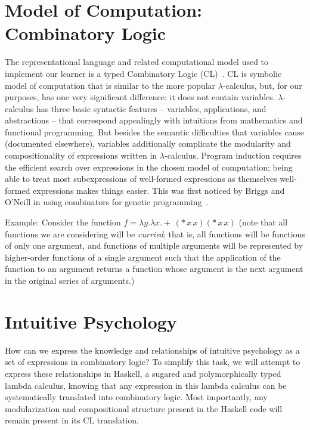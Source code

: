 \documentclass{article}
\begin{document}
\section{Model of Computation: Combinatory Logic}
The representational language and related computational model used to
implement our learner is a typed Combinatory Logic
(CL)~\cite{hindley1972introduction}. CL is symbolic model of
computation that is similar to the more popular $\lambda$-calculus,
but, for our purposes, has one very significant difference: it does
not contain variables. $\lambda$-calculus has three basic syntactic
features -- variables, applications, and abstractions -- that
correspond appealingly with intuitions from mathematics and functional
programming. But besides the semantic difficulties that variables
cause (documented elsewhere), variables additionally complicate the
modularity and compositionality of expressions written in
$\lambda$-calculus. Program induction requires the efficient search
over expressions in the chosen model of computation; being able to
treat most subexpressions of well-formed expressions as themselves
well-formed expressions makes things easier. This was first noticed by
Briggs and O'Neill in using combinators for genetic
programming~\cite{briggs2006functional}. 

Example: Consider the function $f = \lambda y. \lambda x. +\,
(*\, x\, x) (*\, x\, x)$ (note that all functions we are considering
will be \emph{curried}; that is, all functions will be functions of
only one argument, and functions of multiple arguments will be
represented by higher-order functions of a single argument such that
the application of the function to an argument returns a function
whose argument is the next argument in the original series of
arguments.)



\section{Intuitive Psychology}
How can we express the knowledge and relationships of intuitive
psychology as a set of expressions in combinatory logic? To simplify
this task, we will attempt to express these relationships in Haskell,
a sugared and polymorphically typed lambda calculus, knowing that any
expression in this lambda calculus can be systematically translated
into combinatory logic. Most importantly, any modularization and
compositional structure present in the Haskell code will remain
present in its CL translation.
\end{document}
